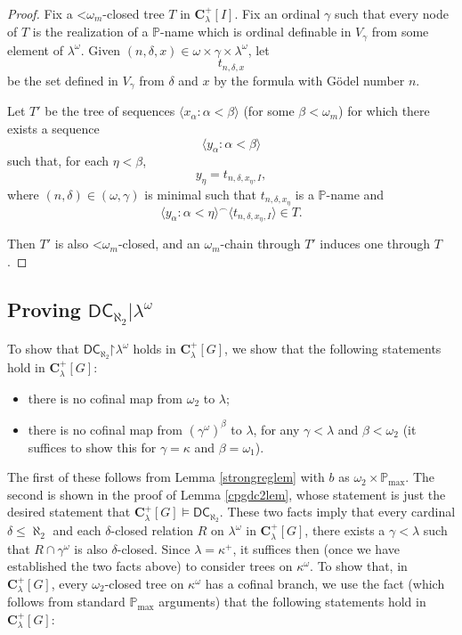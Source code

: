 \documentclass[12pt]{article}
\def\bbC{{\mathbf{C}}}
\newcommand{\bbP}{\mathbb{P}}
\renewcommand{\models}{\vDash}
\newcommand{\pmax}{\mathbb{P}_{\mathrm{max}}}
\newcommand{\DC}{\mathsf{DC}}
\newcommand{\less}{\mathord{<}}
\newcommand{\restrict}{\mathord{\upharpoonright}}
\begin{document}
\begin{proof}
Fix a $\less\omega_{m}$-closed tree $T$ in $\bbC^{+}_{\lambda}[I]$. Fix an ordinal $\gamma$ such that every node of $T$ is the realization of a $\bbP$-name which is ordinal definable in $V_{\gamma}$ from some element of $\lambda^{\omega}$.
Given $(n,\delta, x) \in \omega \times \gamma \times \lambda^{\omega}$, let \[t_{n,\delta, x}\] be the set defined in $V_{\gamma}$ from $\delta$ and $x$ by the formula with G\"{o}del number $n$.

Let $T'$ be the tree of sequences $\langle x_{\alpha} : \alpha < \beta\rangle$ (for some $\beta < \omega_{m}$) for which there exists a sequence \[\langle y_{\alpha} : \alpha < \beta \rangle\] such that, for each $\eta < \beta$, \[y_{\eta} = t_{n,\delta, x_{\eta}, I},\] where $(n, \delta) \in (\omega, \gamma)$ is minimal such that  $t_{n,\delta,x_{\eta}}$ is a $\bbP$-name and
\[\langle y_{\alpha} : \alpha  < \eta \rangle^{\frown} \langle t_{n,\delta,x_{\eta},I}\rangle \in T.\]

Then $T'$ is also $\less\omega_{m}$-closed, and an $\omega_{m}$-chain through $T'$ induces one through $T$.
\end{proof}

\subsection{Proving $\DC_{\aleph_{2}}| \lambda^{\omega}$}\label{dcproveoutlinessec}

To show that $\DC_{\aleph_{2}} \restrict \lambda^{\omega}$ holds in $\bbC^{+}_{\lambda}[G]$, we show that the following statements hold in $\bbC^{+}_{\lambda}[G]$:

\begin{itemize}
\item there is no cofinal map from $\omega_{2}$ to $\lambda$;

\item there is no cofinal map from $(\gamma^{\omega})^{\beta}$ to $\lambda$, for any $\gamma < \lambda$ and $\beta < \omega_{2}$ (it suffices to show this for $\gamma = \kappa$ and $\beta = \omega_{1}$).
\end{itemize}

The first of these follows from Lemma \ref{strongreglem} with $b$ as $\omega_{2} \times \pmax$. The second is shown in the proof of Lemma \ref{cpgdc2lem}, whose statement is just the desired statement that $\bbC^{+}_{\lambda}[G] \models \DC_{\aleph_{2}}$. These two facts imply that every cardinal $\delta \leq \aleph_{2}$ and each $\delta$-closed relation $R$ on $\lambda^{\omega}$ in $\bbC^{+}_{\lambda}[G]$, there exists a $\gamma < \lambda$ such that $R \cap \gamma^{\omega}$ is also $\delta$-closed. Since $\lambda = \kappa^{+}$, it suffices then (once we have established the two facts above) to consider trees on $\kappa^{\omega}$.
To show that, in $\bbC^{+}_{\lambda}[G]$, every $\omega_{2}$-closed tree on $\kappa^{\omega}$ has a cofinal branch, we use the fact (which follows from standard $\pmax$ arguments) that the following statements hold in $\bbC^{+}_{\lambda}[G]$:
\end{document}
